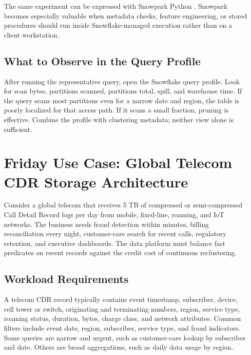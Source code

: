\begin{notebox}
The same experiment can be expressed with Snowpark Python \cite{snowflakeSnowparkPythonDocs}. Snowpark becomes especially valuable when metadata checks, feature engineering, or stored procedures should run inside Snowflake-managed execution rather than on a client workstation.
\end{notebox}

\subsection{What to Observe in the Query Profile}
After running the representative query, open the Snowflake query profile. Look for scan bytes, partitions scanned, partitions total, spill, and warehouse time. If the query scans most partitions even for a narrow date and region, the table is poorly localized for that access path. If it scans a small fraction, pruning is effective. Combine the profile with clustering metadata; neither view alone is sufficient.

\section{Friday Use Case: Global Telecom CDR Storage Architecture}
Consider a global telecom that receives 5 TB of compressed or semi-compressed Call Detail Record logs per day from mobile, fixed-line, roaming, and IoT networks. The business needs fraud detection within minutes, billing reconciliation every night, customer-care search for recent calls, regulatory retention, and executive dashboards. The data platform must balance fast predicates on recent records against the credit cost of continuous reclustering.

\subsection{Workload Requirements}
A telecom CDR record typically contains event timestamp, subscriber, device, cell tower or switch, originating and terminating numbers, region, service type, roaming status, duration, bytes, charge class, and network attributes. Common filters include event date, region, subscriber, service type, and fraud indicators. Some queries are narrow and urgent, such as customer-care lookup by subscriber and date. Others are broad aggregations, such as daily data usage by region.

